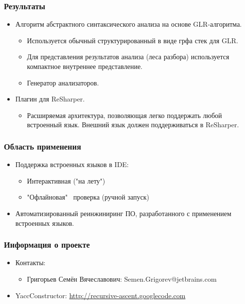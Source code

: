 \documentclass{beamer}
\begin{document}
\begin{frame}[fragile]
	\transwipe[direction=90]
	\frametitle{Результаты}
	\begin{itemize}
	    \item Алгоритм абстрактного синтаксического анализа на основе GLR-алгоритма.
	    \begin{itemize}
	        \item Используется обычный структурированный в виде грфа стек для GLR.
	        \item Для представления результатов анализа (леса разбора) используется компактное внутреннее представление.	        
            \item Генератор анализаторов.
        \end{itemize}
	    \item Плагин для ReSharper.
	    \begin{itemize}
	        \item Расширяемая архитектура, позволяющая легко поддержать любой встроенный язык. Внешний язык должен поддерживаться в ReSharper.
        \end{itemize}
	\end{itemize}
\end{frame}

\begin{frame}
	\transwipe[direction=90]
	\frametitle{Область применения}
	\begin{itemize}
		\item Поддержка встроенных языков в IDE:
    	\begin{itemize}
            \item Интерактивная ("на лету")
            \item "Офлайновая" \ проверка (ручной запуск)
        \end{itemize}
		\item Автоматизированный реинжиниринг ПО, разработанного с применением встроенных языков.
	\end{itemize}
\end{frame}

\begin{frame}
	\transwipe[direction=90]
	\frametitle{Информация о проекте}
	\begin{itemize}
		\item Контакты: 
        \begin{itemize}
            \item Григорьев Семён Вячеславович: Semen.Grigorev@jetbrains.com
        \end{itemize}
		\item YaccConstructor: \href{http://recursive-ascent.googlecode.com}{http://recursive-ascent.googlecode.com}
	\end{itemize}
\end{frame}
\end{document}
